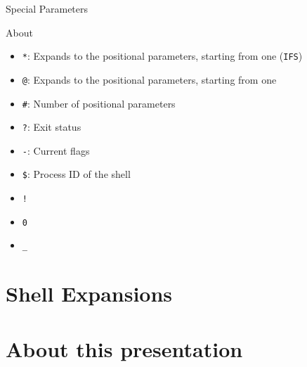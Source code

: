 \documentclass[10pt, compress, aspectratio=169]{beamer}
\begin{document}
\begin{frame}{Special Parameters}
  \begin{exampleblock}{About}
    \begin{itemize}
      \item \texttt{*}: Expands to the positional parameters, starting from one
						(\texttt{IFS})
      \item \texttt{@}: Expands to the positional parameters, starting from one
      \item \texttt{\#}: Number of positional parameters
      \item \texttt{?}: Exit status
      \item \texttt{-}: Current flags
      \item \texttt{\$}: Process ID of the shell
      \item \texttt{!}
      \item \texttt{0}
      \item \texttt{\_}
    \end{itemize}
  \end{exampleblock}
\end{frame}
\section{Shell Expansions}

\section{About this presentation}
\begin{frame}[standout]
   \begin{center}\ccbysa\end{center}
\end{frame}

\maketitle
\end{document}
